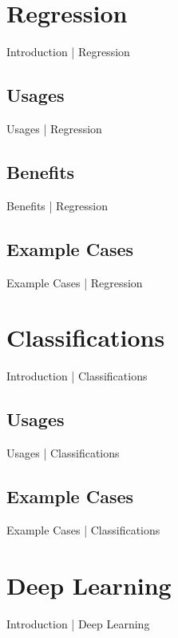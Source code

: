 \documentclass[10pt]{beamer}
\begin{document}
	\section{Regression}
		\begin{frame}{Introduction | Regression}
		\end{frame}
		\subsection{Usages}
			\begin{frame}{Usages | Regression}
			\end{frame}
		\subsection{Benefits}
			\begin{frame}{Benefits | Regression}
			\end{frame}
		\subsection{Example Cases}
			\begin{frame}{Example Cases | Regression}
			\end{frame}
	
	\section{Classifications}
		\begin{frame}{Introduction | Classifications}
		\end{frame}
		\subsection{Usages}
			\begin{frame}{Usages | Classifications}
			\end{frame}
		\subsection{Example Cases}
			\begin{frame}{Example Cases | Classifications}
			\end{frame}
	
	
	\section{Deep Learning}
		\begin{frame}{Introduction | Deep Learning}
		\end{frame}
\end{document}
